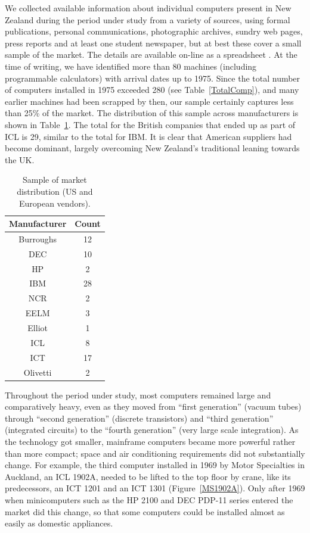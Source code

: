 \documentclass{IEEEcsmag}
\begin{document}
We collected available information about individual computers present in New Zealand during the period under study from a
\cbstart
variety of sources, using formal publications, personal communications, photographic archives, sundry web pages, press reports and at least one student newspaper, but at best these cover a small sample of the market.
The details are available on-line as a spreadsheet \cite{SpreadsheetNZ}.
At the time of writing, we have identified more than 80 machines (including programmable calculators) with arrival dates up to 1975. Since the total number of computers installed in 1975 exceeded 280 (see Table~\ref{TotalComp}), and many earlier machines had been scrapped by then, our sample certainly captures less than 25\% of the market. The distribution of this sample across manufacturers is shown in Table~\ref{TotalManuf}. The total for the British companies that ended up as part of ICL is 29, similar to the total for IBM. It is clear that American suppliers had become dominant, largely overcoming New Zealand’s traditional leaning towards the UK.
\cbend
\begin{table}[h]
\begin{center}
\begin{tabular}{ |c|c| } 
 \hline
Manufacturer & Count\\ 
\hline
Burroughs & 12\\
DEC & 10\\
HP & 2\\
IBM & 28\\
NCR & 2\\
\hline
EELM & 3\\
Elliot & 1\\
ICL & 8\\
ICT & 17\\ 
Olivetti & 2\\
\hline
\end{tabular}
\vspace{1ex}
\caption{\label{TotalManuf}Sample of market distribution (US and European vendors).}
\end{center}
\end{table}

Throughout the period under study, most computers remained large and comparatively heavy, even as they moved from “first generation” (vacuum tubes) through “second generation” (discrete transistors) and “third generation” (integrated circuits) to the “fourth generation” (very large scale integration). As the technology got smaller, mainframe computers became more powerful rather than more compact; space and air conditioning requirements did not substantially change. For example, the third computer installed in 1969 by Motor Specialties in Auckland, an ICL 1902A, needed to be lifted to the top floor by crane, like its predecessors, an ICT 1201 and an ICT 1301 (Figure~\ref{MS1902A}). Only after 1969 when minicomputers such as the HP 2100 and DEC PDP-11 series entered the market did this change, so that some computers could be installed almost as easily as domestic appliances.
\end{document}
